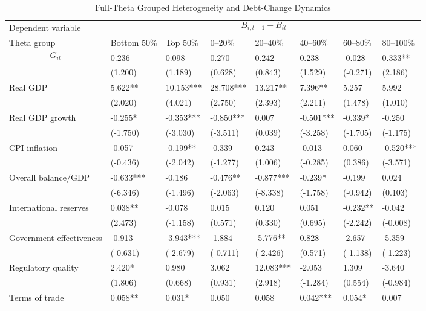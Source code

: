 \begin{table}[H]\centering
\begin{threeparttable}
\caption{Full-Theta Grouped Heterogeneity and Debt-Change Dynamics}
\label{tab:theta_group_heterogeneity_debt}
\scriptsize
\begin{tabularx}{\textwidth}{lYYYYYYY}
\toprule
Dependent variable &  \\
\cmidrule(lr){2-8}
Theta group & Bottom 50\% & Top 50\% & 0--20\% & 20--40\% & 40--60\% & 60--80\% & 80--100\% \\
\midrule
$$G_{it}$$ & 0.236 & 0.098 & 0.270 & 0.242 & 0.238 & -0.028 & 0.333** \\
  & (1.200) & (1.189) & (0.628) & (0.843) & (1.529) & (-0.271) & (2.186) \\
Real GDP & 5.622** & 10.153*** & 28.708*** & 13.217** & 7.396** & 5.257 & 5.992 \\
  & (2.020) & (4.021) & (2.750) & (2.393) & (2.211) & (1.478) & (1.010) \\
Real GDP growth & -0.255* & -0.353*** & -0.850*** & 0.007 & -0.501*** & -0.339* & -0.250 \\
  & (-1.750) & (-3.030) & (-3.511) & (0.039) & (-3.258) & (-1.705) & (-1.175) \\
CPI inflation & -0.057 & -0.199** & -0.339 & 0.243 & -0.013 & 0.060 & -0.520*** \\
  & (-0.436) & (-2.042) & (-1.277) & (1.006) & (-0.285) & (0.386) & (-3.571) \\
Overall balance/GDP & -0.633*** & -0.186 & -0.476** & -0.877*** & -0.239* & -0.199 & 0.024 \\
  & (-6.346) & (-1.496) & (-2.063) & (-8.338) & (-1.758) & (-0.942) & (0.103) \\
International reserves & 0.038** & -0.078 & 0.015 & 0.120 & 0.051 & -0.232** & -0.042 \\
  & (2.473) & (-1.158) & (0.571) & (0.330) & (0.695) & (-2.242) & (-0.008) \\
Government effectiveness & -0.913 & -3.943*** & -1.884 & -5.776** & 0.828 & -2.657 & -5.359 \\
  & (-0.631) & (-2.679) & (-0.711) & (-2.426) & (0.571) & (-1.138) & (-1.223) \\
Regulatory quality & 2.420* & 0.980 & 3.062 & 12.083*** & -2.053 & 1.309 & -3.640 \\
  & (1.806) & (0.668) & (0.931) & (2.918) & (-1.284) & (0.554) & (-0.984) \\
Terms of trade & 0.058** & 0.031* & 0.050 & 0.058 & 0.042*** & 0.054* & 0.007 \\

\end{tabularx}
\end{threeparttable}
\end{table}
